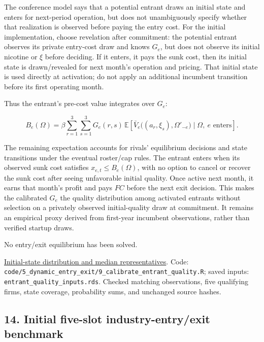 \documentclass[10pt,]{article}
\begin{document}
The conference model says that a potential entrant draws an initial
state and enters for next-period operation, but does not unambiguously
specify whether that realization is observed before paying the entry
cost. For the initial implementation, choose revelation after
commitment: the potential entrant observes its private entry-cost draw
and knows \(G_e\), but does not observe its initial nicotine or \(\xi\)
before deciding. If it enters, it pays the sunk cost, then its initial
state is drawn/revealed for next month's operation and pricing. That
initial state is used directly at activation; do not apply an additional
incumbent transition before its first operating month.

Thus the entrant's pre-cost value integrates over \(G_e\):

\[
B_e(\Omega)=\beta\sum_{r=1}^{3}\sum_{s=1}^{3}G_e(r,s)\,
\mathbb{E}\!\left[\bar V_e\big((a_r,\xi_s),\Omega'_{-e}\big)
\mid\Omega,\ e\text{ enters}\right].
\]

The remaining expectation accounts for rivals' equilibrium decisions and
state transitions under the eventual roster/cap rules. The entrant
enters when its observed sunk cost satisfies
\(x_{e,t}\leq B_e(\Omega)\), with no option to cancel or recover the
sunk cost after seeing unfavorable initial quality. Once active next
month, it earns that month's profit and pays \(FC\) before the next exit
decision. This makes the calibrated \(G_e\) the quality distribution
among activated entrants without selection on a privately observed
initial-quality draw at commitment. It remains an empirical proxy
derived from first-year incumbent observations, rather than verified
startup draws.

No entry/exit equilibrium has been solved.

\href{../../output/dynamic_entry_exit/entrant_quality_2026-11-04/entrant_initial_state_distribution.csv}{Initial-state
distribution and median representatives}. Code:
\texttt{code/5\_dynamic\_entry\_exit/9\_calibrate\_entrant\_quality.R};
saved inputs: \texttt{entrant\_quality\_inputs.rds}. Checked matching
observations, five qualifying firms, state coverage, probability sums,
and unchanged source hashes.

\subsection{14. Initial five-slot industry-entry/exit
benchmark}\label{initial-five-slot-industry-entryexit-benchmark}
\end{document}
